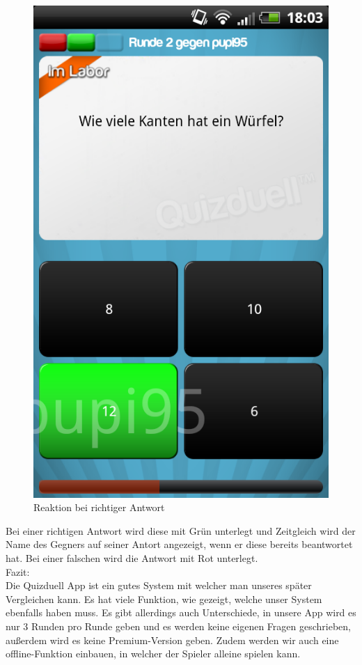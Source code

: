 \documentclass[fontsize=12pt,paper=a4,twoside]{scrartcl}
\begin{document}
\begin{figure}[H]
\centering
\includegraphics[scale=0.5]{Bilder/antwort.png}
\caption{Reaktion bei richtiger Antwort}
\end{figure}

Bei einer richtigen Antwort wird diese mit Grün unterlegt und Zeitgleich wird der Name des Gegners auf seiner Antort angezeigt, wenn er diese bereits beantwortet hat. Bei einer falschen wird die Antwort mit Rot unterlegt.\\

Fazit:\\
Die Quizduell App ist ein gutes System mit welcher man unseres später Vergleichen kann. Es hat viele Funktion, wie gezeigt, welche unser System ebenfalls haben muss. Es gibt allerdings auch Unterschiede, in unsere App wird es nur 3 Runden pro Runde geben und es werden keine eigenen Fragen geschrieben, außerdem wird es keine Premium-Version geben. Zudem werden wir auch eine offline-Funktion einbauen, in welcher der Spieler alleine spielen kann.\\ 
\end{document}
